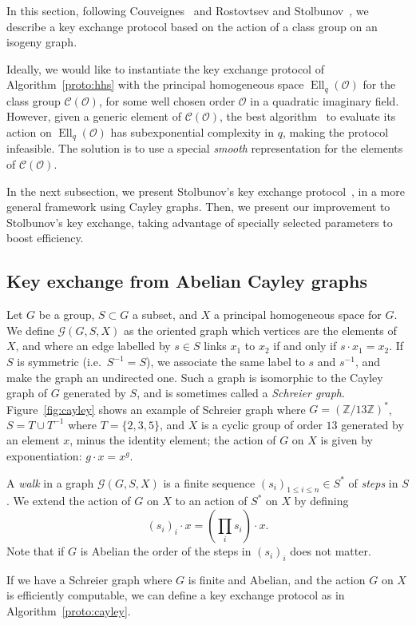 \documentclass{article}
\newcommand{\Cl}{\mathcal{C}}
\newcommand{\Graph}{\mathcal{G}}
\renewcommand{\O}{\mathcal{O}}
\theoremstyle{definition}
\DeclareMathOperator{\Ell}{Ell}
\begin{document}
In this section, following Couveignes~\cite{cryptoeprint:2006:291} and
Rostovtsev and Stolbunov~\cite{rostovtsev+stolbunov06}, we describe a
key exchange protocol based on the action of a class group on an
isogeny graph.

Ideally, we would like to instantiate the key exchange protocol of
Algorithm~\ref{proto:hhs} with the principal homogeneous space
$\Ell_q(\O)$ for the class group $\Cl(\O)$, for some well chosen order
$\O$ in a quadratic imaginary field. However, given a generic element
of $\Cl(\O)$, the best algorithm~\cite{jao+soukharev10} to evaluate
its action on $\Ell_q(\O)$ has subexponential complexity in $q$,
making the protocol infeasible. The solution is to use a special
\emph{smooth} representation for the elements of $\Cl(\O)$.

In the next subsection, we present Stolbunov's key exchange
protocol~\cite{Stol}, in a more general framework using Cayley graphs.
Then, we present our improvement to Stolbunov's key exchange, taking
advantage of specially selected parameters to boost efficiency.


\subsection{Key exchange from Abelian Cayley graphs}

Let $G$ be a group, $S⊂G$ a subset, and $X$ a principal homogeneous
space for $G$. We define $\Graph(G, S, X)$ as the oriented graph which
vertices are the elements of $X$, and where an edge labelled by $s∈S$
links $x_1$ to $x_2$ if and only if $s\cdot x_1 = x_2$.  If $S$ is
symmetric (i.e.\ $S^{-1}=S$), we associate the same label to $s$ and
$s^{-1}$, and make the graph an undirected one. Such a graph is
isomorphic to the Cayley graph of $G$ generated by $S$, and is
sometimes called a \emph{Schreier graph}.  Figure~\ref{fig:cayley}
shows an example of Schreier graph where $G=(ℤ/13ℤ)^*$, $S=T∪T^{-1}$
where $T=\{2,3,5\}$, and $X$ is a cyclic group of order $13$ generated
by an element $x$, minus the identity element; the action of $G$ on
$X$ is given by exponentiation: $g·x=x^g$.

A \emph{walk} in a graph $\Graph(G,S,X)$ is a finite sequence
$(s_i)_{1≤i≤n}∈S^*$ of \emph{steps} in $S$. We extend the action of
$G$ on $X$ to an action of $S^*$ on $X$ by defining
\[(s_i)_i·x = \left(\prod_i s_i\right)·x.\] %
Note that if $G$ is Abelian the order of the steps in $(s_i)_i$ does
not matter.

If we have a Schreier graph where $G$ is finite and Abelian, and the
action $G$ on $X$ is efficiently computable, we can define a key
exchange protocol as in Algorithm~\ref{proto:cayley}.
\end{document}
